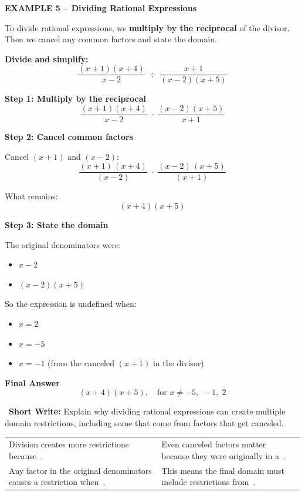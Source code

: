 \documentclass[11pt]{article}
\newcommand{\blk}[1][1.2cm]{\underline{\hspace{#1}}}
\newcommand{\examplehead}[1]{%
  \vspace{6pt}%
  \noindent\colorbox{hlcyan}{\parbox{\dimexpr\linewidth-2\fboxsep}{\textbf{#1}}}%
  \vspace{2pt}%
}
\newcommand{\shortwrite}[1]{%
  \vspace{3pt}%
  \noindent\ding{97}~\textbf{Short Write:} #1\par%
}
\begin{document}
\examplehead{EXAMPLE 5 -- Dividing Rational Expressions}

\noindent To divide rational expressions, we \textbf{multiply by the
reciprocal} of the divisor.  Then we cancel any common factors and state
the domain.

\noindent\textbf{Divide and simplify:}
\[
  \frac{(x+1)(x+4)}{x-2}\;\div\;\frac{x+1}{(x-2)(x+5)}
\]

\noindent\textbf{Step 1:\; Multiply by the reciprocal}
\[
  \frac{(x+1)(x+4)}{x-2}\;\cdot\;\frac{(x-2)(x+5)}{x+1}
\]

\noindent\textbf{Step 2:\; Cancel common factors}\par
Cancel $(x+1)$ and $(x-2)$:
\[
  \frac{\boxed{(x+1)}\,(x+4)}{\boxed{(x-2)}} \;\cdot\;
  \frac{\boxed{(x-2)}\,(x+5)}{\boxed{(x+1)}}
\]

\noindent What remains:
\[
  (x+4)(x+5)
\]

\noindent\textbf{Step 3:\; State the domain}\par
The original denominators were:
\begin{itemize}[leftmargin=1.5em,itemsep=1pt,topsep=2pt]
  \item $x-2$
  \item $(x-2)(x+5)$
\end{itemize}
So the expression is undefined when:
\begin{itemize}[leftmargin=1.5em,itemsep=1pt,topsep=2pt]
  \item $x = 2$
  \item $x = -5$
  \item $x = -1$\; (from the canceled $(x+1)$ in the divisor)
\end{itemize}

\noindent\textbf{Final Answer}
\[
  (x+4)(x+5),\quad \text{for } x\neq -5,\;-1,\;2
\]

\shortwrite{Explain why dividing rational expressions can create multiple
domain restrictions, including some that come from factors that get canceled.}

\begin{workspace}[3]\end{workspace}

\vspace{4pt}
\begin{frames}
\begin{tabularx}{\linewidth}{XX}
  Division creates more restrictions because \blk[2.5cm]\,.\; &
  Even canceled factors matter because they were originally in a \blk[2.5cm]\,.\; \\
  \vspace{4pt}\par
  Any factor in the original denominators causes a restriction when \blk[2.5cm]\,.\; &
  \vspace{4pt}\par
  This means the final domain must include restrictions from \blk[2.5cm]\,.\; \\
\end{tabularx}
\end{frames}
\end{document}

